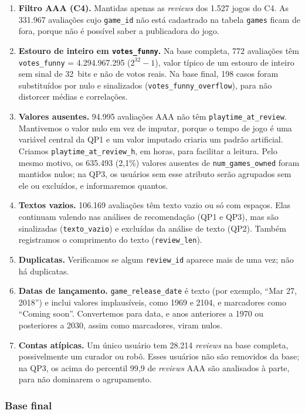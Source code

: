 \documentclass[12pt]{article}
\newcommand{\NVAZIO}{106.169}
\newcommand{\NFUNNY}{198}
\newcommand{\NPTNULO}{94.995}
\newcommand{\NGONULO}{635.493 (2,1\%)}
\begin{document}
\begin{enumerate}
\item \textbf{Filtro AAA (C4).} Mantidas apenas as \textit{reviews} dos 1.527 jogos do C4.
As 331.967 avaliações cujo \texttt{game\_id} não está cadastrado na tabela \texttt{games} ficam de
fora, porque não é possível saber a publicadora do jogo.
\item \textbf{Estouro de inteiro em \texttt{votes\_funny}.} Na base completa, 772 avaliações têm
\texttt{votes\_funny} = 4.294.967.295 ($2^{32}-1$), valor típico de um estouro de inteiro sem
sinal de 32~bits e não de votos reais. Na base final, \NFUNNY{} casos foram substituídos por nulo
e sinalizados (\texttt{votes\_funny\_overflow}), para não distorcer médias e correlações.
\item \textbf{Valores ausentes.} \NPTNULO{} avaliações AAA não têm
\texttt{playtime\_at\_review}. Mantivemos o valor nulo em vez de imputar, porque o tempo de jogo
é uma variável central da QP1 e um valor imputado criaria um padrão artificial. Criamos
\texttt{playtime\_at\_review\_h}, em horas, para facilitar a leitura. Pelo mesmo motivo, os \NGONULO{} valores ausentes de \texttt{num\_games\_owned} foram mantidos nulos; na QP3, os usuários sem esse atributo serão agrupados sem ele ou excluídos, e informaremos quantos.
\item \textbf{Textos vazios.} \NVAZIO{} avaliações têm texto vazio ou só com espaços. Elas
continuam valendo nas análises de recomendação (QP1 e QP3), mas são sinalizadas
(\texttt{texto\_vazio}) e excluídas da análise de texto (QP2). Também registramos o comprimento
do texto (\texttt{review\_len}).
\item \textbf{Duplicatas.} Verificamos se algum \texttt{review\_id} aparece mais de uma vez;
não há duplicatas.
\item \textbf{Datas de lançamento.} \texttt{game\_release\_date} é texto (por exemplo,
``Mar 27, 2018'') e inclui valores implausíveis, como 1969 e 2104, e marcadores como ``Coming
soon''. Convertemos para data, e anos anteriores a 1970 ou posteriores a 2030, assim como
marcadores, viram nulos.
\item \textbf{Contas atípicas.} Um único usuário tem 28.214 \textit{reviews} na base completa,
possivelmente um curador ou robô. Esses usuários não são removidos da base; na QP3, os acima do
percentil 99,9 de \textit{reviews} AAA são analisados à parte, para não dominarem o agrupamento.
\end{enumerate}

\subsubsection{Base final}
\end{document}
